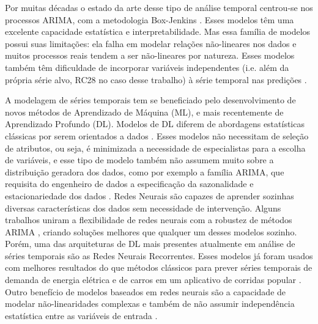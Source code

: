 Por muitas décadas o estado da arte desse tipo de análise temporal centrou-se
nos processos ARIMA, com a metodologia Box-Jenkins \citep{arima}.
Esses modelos têm uma excelente capacidade estatística e interpretabilidade.
Mas essa família de modelos possui suas limitações:
ela falha em modelar relações não-lineares nos dados \citep{forecasting} e 
muitos processos reais tendem a ser não-lineares por natureza.
Esses modelos também têm dificuldade de incorporar variáveis independentes (i.e.
além da própria série alvo, RC28 no caso desse trabalho) à série temporal nas predições \citep{ubertime}.


A modelagem de séries temporais tem se beneficiado pelo desenvolvimento de novos
métodos de Aprendizado de Máquina (ML), e mais recentemente de Aprendizado Profundo (DL).
Modelos de DL diferem de abordagens estatísticas clássicas por serem orientados
a dados \citep{dlbook}.
Esses modelos não necessitam de seleção de atributos, ou seja, é minimizada a
necessidade de especialistas para a escolha de variáveis, e esse tipo de modelo também não
assumem muito sobre a distribuição geradora dos dados, como por exemplo a
família ARIMA, que requisita do engenheiro de dados a especificação da
sazonalidade e estacionariedade dos dados \citep{arima}.
Redes Neurais são capazes de aprender sozinhas diversas características dos dados sem necessidade de intervenção. 
Alguns trabalhos uniram a flexibilidade de redes neurais com a robustez de
métodos ARIMA \citep{DIAZROBLES20088331,KHASHEI2010479},
criando soluções melhores que qualquer um desses modelos sozinho. Porém, uma das
arquiteturas de DL mais presentes atualmente em análise de séries temporais
são as Redes Neurais Recorrentes. Esses modelos já foram usados com
melhores resultados do que métodos clássicos para prever séries temporais de
demanda de energia elétrica e de carros em um aplicativo de corridas popular
\citep{energylstm,ubertime}. Outro benefício de modelos baseados em redes
neurais são a capacidade de modelar não-linearidades complexas e também de não
assumir independência estatística entre as variáveis de entrada \citep{dlbook}.


